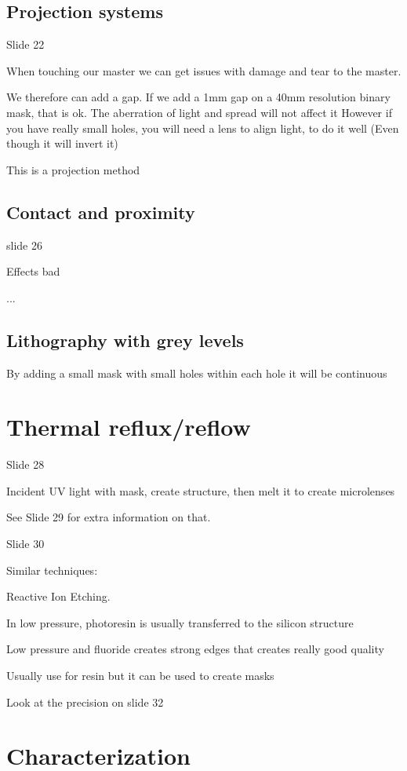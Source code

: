 \documentclass[../main/main.tex]{subfiles}
\begin{document}
\subsection{Projection systems}
Slide 22

When touching our master we can get issues with damage and tear to the master.

We therefore can add a gap. If we add a 1mm gap on a 40mm resolution binary mask, that is ok. The aberration of light and spread will not affect it
However if you have really small holes, you will need a lens to align light, to do it well (Even though it will invert it)

This is a projection method

\subsection{Contact and proximity}

slide 26

Effects bad

...


\subsection{Lithography with grey levels}

By adding a small mask with small holes within each hole it will be continuous


\section{Thermal reflux/reflow}

Slide 28

Incident UV light with mask, create structure, then melt it to create microlenses

See Slide 29 for extra information on that.


Slide 30

Similar techniques:

Reactive Ion Etching.

In low pressure, photoresin is usually transferred to the silicon structure

Low pressure and fluoride creates strong edges that creates really good quality

Usually use for resin but it can be used to create masks

Look at the precision on slide 32


\section{Characterization}
\end{document}
